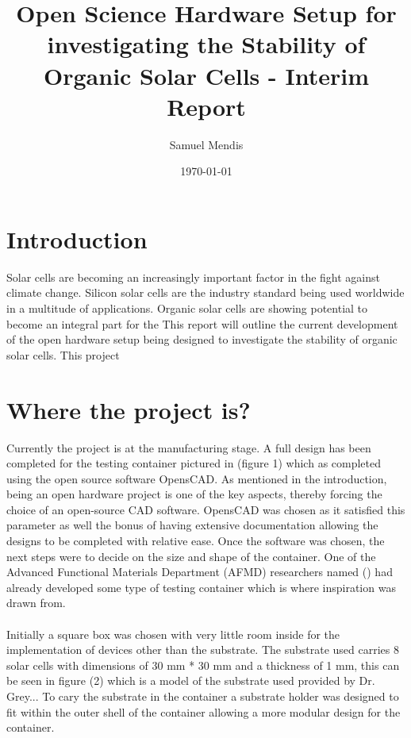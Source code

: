 \documentclass[a4paper,11pt]{article}
\begin{document}
\title{Open Science Hardware Setup for investigating the Stability of Organic Solar Cells - Interim Report}
\author{Samuel Mendis}
\date{\today}
\maketitle
\pagebreak
\section{Introduction}
Solar cells are becoming an increasingly important factor in the fight against climate change. Silicon solar cells are the industry standard being used worldwide in a multitude of applications. Organic solar cells are showing potential to become an integral part for the  This report will outline the current development of the open hardware setup being designed to investigate the stability of organic solar cells. This project 
\section{Where the project is?}
Currently the project is at the manufacturing stage. A full design has been completed for the testing container pictured in (figure 1) which as completed using the open source software OpensCAD. As mentioned in the introduction, being an open hardware project is one of the key aspects, thereby forcing the choice of an open-source CAD software. OpensCAD was chosen as it satisfied this parameter as well the bonus of having extensive documentation allowing the designs to be completed with relative ease. Once the software was chosen, the next steps were to decide on the size and shape of the container. One of the Advanced Functional Materials Department (AFMD) researchers named () had already developed some type of testing container which is where inspiration was drawn from. 
\\
\\
Initially a square box was chosen with very little room inside for the implementation of devices other than the substrate. The substrate used carries 8 solar cells with dimensions of 30 mm * 30 mm and a thickness of 1 mm, this can be seen in figure (2) which is a model of the substrate used provided by Dr. Grey... To cary the substrate in the container a substrate holder was designed to fit within the outer shell of the container allowing a more modular design for the container. 
\end{document}
